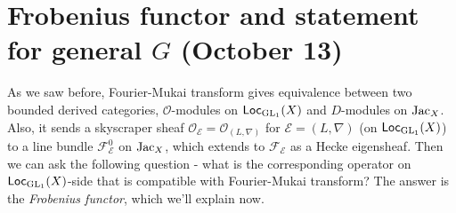 \newpage
\section{Frobenius functor and statement for general $G$ (October 13)}

As we saw before, Fourier-Mukai transform gives equivalence between two bounded derived categories, $\mathcal{O}$-modules on 
$\operatorname{\mathsf{Loc}}_{\operatorname{\mathrm{GL}}_1}(X)$ and $D$-modules on $\operatorname{\mathrm{Jac}}_X$.
Also, it sends a skyscraper sheaf $\mathcal{O}_{\mathcal{E}} =\mathcal{O}_{(L, \nabla)}$ for $\mathcal{E} = (L, \nabla)$ (on $\operatorname{\mathsf{Loc}}_{\operatorname{\mathrm{GL}}_1}(X)$) to a line bundle $\mathcal{F}_{\mathcal{E}}^{0}$ on $\operatorname{\mathrm{Jac}}_X$,
which extends to $\mathcal{F}_{\mathcal{E}}$ as a Hecke eigensheaf.
Then we can ask the following question - what is the corresponding operator on $\operatorname{\mathsf{Loc}}_{\operatorname{\mathrm{GL}}_1}(X)$-side that is compatible with Fourier-Mukai transform?
The answer is the \emph{Frobenius functor}, which we'll explain now.

